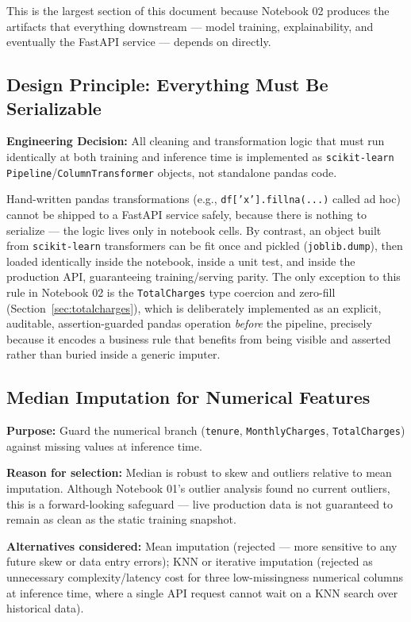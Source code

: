 \documentclass[11pt]{article}
\newcommand{\decision}[1]{%
\begin{decisionbox}
\textbf{\color{navy}Engineering Decision:} #1
\end{decisionbox}
}
\newcommand{\artifact}[1]{\texttt{\color{navy}#1}}
\begin{document}
This is the largest section of this document because Notebook 02 produces the artifacts that everything downstream --- model training, explainability, and eventually the FastAPI service --- depends on directly.

\subsection{Design Principle: Everything Must Be Serializable}

\decision{All cleaning and transformation logic that must run identically at both training and inference time is implemented as \texttt{scikit-learn} \texttt{Pipeline}/\texttt{ColumnTransformer} objects, not standalone pandas code.}

Hand-written pandas transformations (e.g., \texttt{df['x'].fillna(...)} called ad hoc) cannot be shipped to a FastAPI service safely, because there is nothing to serialize --- the logic lives only in notebook cells. By contrast, an object built from \texttt{scikit-learn} transformers can be fit once and pickled (\texttt{joblib.dump}), then loaded identically inside the notebook, inside a unit test, and inside the production API, guaranteeing training/serving parity. The only exception to this rule in Notebook 02 is the \artifact{TotalCharges} type coercion and zero-fill (Section~\ref{sec:totalcharges}), which is deliberately implemented as an explicit, auditable, assertion-guarded pandas operation \emph{before} the pipeline, precisely because it encodes a business rule that benefits from being visible and asserted rather than buried inside a generic imputer.

\subsection{Median Imputation for Numerical Features}

\textbf{Purpose:} Guard the numerical branch (\artifact{tenure}, \artifact{MonthlyCharges}, \artifact{TotalCharges}) against missing values at inference time.

\textbf{Reason for selection:} Median is robust to skew and outliers relative to mean imputation. Although Notebook 01's outlier analysis found no current outliers, this is a forward-looking safeguard --- live production data is not guaranteed to remain as clean as the static training snapshot.

\textbf{Alternatives considered:} Mean imputation (rejected --- more sensitive to any future skew or data entry errors); KNN or iterative imputation (rejected as unnecessary complexity/latency cost for three low-missingness numerical columns at inference time, where a single API request cannot wait on a KNN search over historical data).
\end{document}
